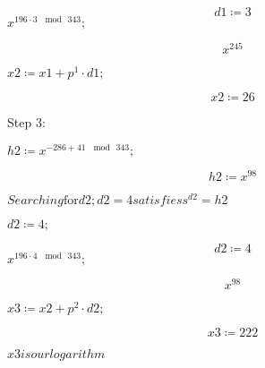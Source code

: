 \documentclass{article}
\begin{document}
\begin{dmath}\label{(8)}
\mathit{d1} \coloneqq 3
\end{dmath}
\mapleinput
{$ \displaystyle x^{196\cdot 3\,\mod \,343}; $}

\begin{dmath}\label{(9)}
x^{245}
\end{dmath}
\begin{Maple Normal}

\end{Maple Normal}
\mapleinput
{$ \displaystyle \mathit{x2} \coloneqq \mathit{x1} +p^{1}\cdot \mathit{d1} ; $}

\begin{dmath}\label{(10)}
\mathit{x2} \coloneqq 26
\end{dmath}
\begin{Maple Normal}
Step 3:
\end{Maple Normal}
\begin{Maple Normal}

\end{Maple Normal}
\mapleinput
{$ \displaystyle \mathit{h2} \coloneqq x^{-286+41\,\mod \,343}; $}

\begin{dmath}\label{(11)}
\mathit{h2} \coloneqq x^{98}
\end{dmath}
\begin{Maple Normal}
{$ \displaystyle \mathit{Searching} \boldsymbol{\mathrm{for}}\mathit{d2} ;\mathit{d2} =4\mathit{satisfies} s^{\mathit{d2}}=\mathit{h2}  $}
\end{Maple Normal}
\begin{Maple Normal}

\end{Maple Normal}
\mapleinput
{$ \displaystyle \mathit{d2} \coloneqq 4; $}

\begin{dmath}\label{(12)}
\mathit{d2} \coloneqq 4
\end{dmath}
\mapleinput
{$ \displaystyle x^{196\cdot 4\,\mod \,343}; $}

\begin{dmath}\label{(13)}
x^{98}
\end{dmath}
\begin{Maple Normal}

\end{Maple Normal}
\mapleinput
{$ \displaystyle \mathit{x3} \coloneqq \mathit{x2} +p^{2}\cdot \mathit{d2} ; $}

\begin{dmath}\label{(14)}
\mathit{x3} \coloneqq 222
\end{dmath}
\begin{Maple Normal}
{$ \displaystyle \mathit{x3} \mathit{is} \mathit{our} \mathit{logarithm}  $}
\end{Maple Normal}
\begin{Maple Normal}

\end{Maple Normal}
\end{document}
